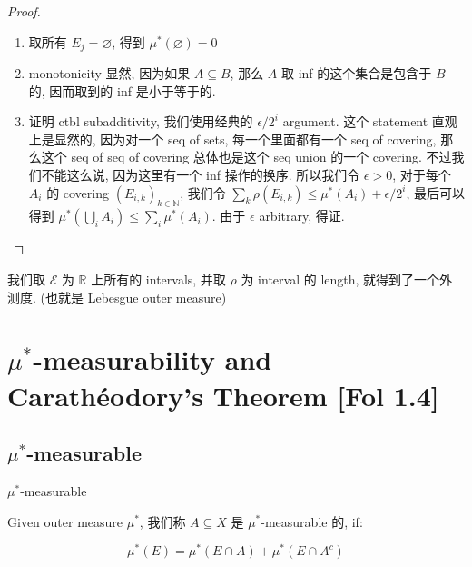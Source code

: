 \documentclass{qlnotes-export}
\begin{document}
\begin{proof}

\begin{enumerate}
\item
  取所有 \(E_{j} = \varnothing\), 得到 \(\mu^{\ast}(\varnothing) = 0\)
\item
  monotonicity 显然, 因为如果 \(A \subseteq B\), 那么 \(A\) 取 inf 的这个集合是包含于 \(B\) 的, 因而取到的 inf 是小于等于的.
\item
  证明 ctbl subadditivity, 我们使用经典的 \(\epsilon/2^{i}\) argument. 这个 statement 直观上是显然的, 因为对一个 seq of sets, 每一个里面都有一个 seq of covering, 那么这个 seq of seq of covering 总体也是这个 seq union 的一个 covering. 不过我们不能这么说, 因为这里有一个 inf 操作的换序. 所以我们令 \(\epsilon > 0\), 对于每个 \(A_{i}\) 的 covering \((E_{i,k})_{k \in {\mathbb{N}}}\), 我们令 \(\sum_{k}\rho(E_{i,k}) \leq \mu^{\ast}(A_{i}) + \epsilon/2^{i}\), 最后可以得到 \(\mu^{\ast}(\bigcup_{i}A_{i}) \leq \sum_{i}\mu^{\ast}(A_{i})\). 由于 \(\epsilon\) arbitrary, 得证.
\end{enumerate}

\end{proof}

\begin{example}\label{ex-02-outer-measure-completion-of-a-measurable-space-example-002}

我们取 \(\mathcal{E}\) 为 \(\mathbb{R}\) 上所有的 intervals, 并取 \(\rho\) 为 interval 的 length, 就得到了一个外测度. (也就是 Lebesgue outer measure)

\end{example}

\section{\texorpdfstring{\(\mu^{\ast}\)-measurability and Carathéodory's Theorem {[}Fol 1.4{]}}{\textbackslash mu\^{}\{\textbackslash ast\}-measurability and Carathéodory's Theorem {[}Fol 1.4{]}}}

\subsection{\texorpdfstring{\(\mu^{\ast}\)-measurable}{\textbackslash mu\^{}\{\textbackslash ast\}-measurable}}\label{muast-measurable}

\begin{definition}{\(\mu^{\ast}\)-measurable}\label{def-02-outer-measure-completion-of-a-measurable-space-mu-measurable}

Given outer measure \(\mu^{\ast}\), 我们称 \(A \subseteq X\) 是 \(\mu^{\ast}\)-measurable 的, if:

\[\mu^{\ast}(E) = \mu^{\ast}(E \cap A) + \mu^{\ast}(E \cap A^{c})\]

\end{definition}
\end{document}
